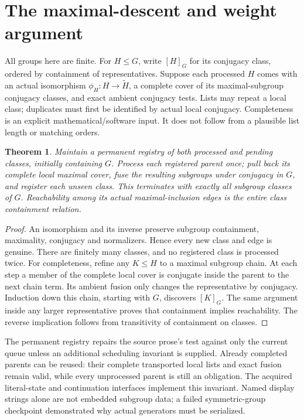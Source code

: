 \documentclass[11pt]{article}
\newtheorem{theorem}{Theorem}\newtheorem{proposition}[theorem]{Proposition}
\begin{document}
\section{The maximal-descent and weight argument}
All groups here are finite. For $H\leq G$, write $[H]_G$ for its conjugacy
class, ordered by containment of representatives. Suppose each processed
$H$ comes with an actual isomorphism $\phi_H:H\to\widetilde H$, a complete
cover of its maximal-subgroup conjugacy classes, and exact ambient conjugacy
tests. Lists may repeat a local class; duplicates must first be identified
by actual local conjugacy. Completeness is an explicit mathematical/software
input. It does not follow from a plausible list length or matching orders.

\begin{theorem}
Maintain a permanent registry of both processed and pending classes,
initially containing $G$. Process each registered parent once; pull back its
complete local maximal cover, fuse the resulting subgroups under conjugacy
in $G$, and register each unseen class. This terminates with exactly all
subgroup classes of $G$. Reachability among its actual maximal-inclusion
edges is the entire class containment relation.
\end{theorem}
\begin{proof}
An isomorphism and its inverse preserve subgroup containment, maximality,
conjugacy and normalizers. Hence every new class and edge is genuine.
There are finitely many classes, and no registered class is processed twice.
For completeness, refine any $K\leq H$ to a maximal subgroup chain.
At each step a member of the complete local cover is conjugate inside the
parent to the next chain term. Its ambient fusion only changes the
representative by conjugacy. Induction down this chain, starting with $G$,
discovers $[K]_G$. The same argument inside any larger representative proves
that containment implies reachability. The reverse implication follows
from transitivity of containment on classes.
\end{proof}
The permanent registry repairs the source prose's test against only the
current queue unless an additional scheduling invariant is supplied.
Already completed parents can be reused: their complete transported local
lists and exact fusion remain valid, while every unprocessed parent is
still an obligation. The acquired literal-state and continuation interfaces
implement this invariant. Named display strings alone are not embedded
subgroup data; a failed symmetric-group checkpoint demonstrated why actual
generators must be serialized.
\end{document}
